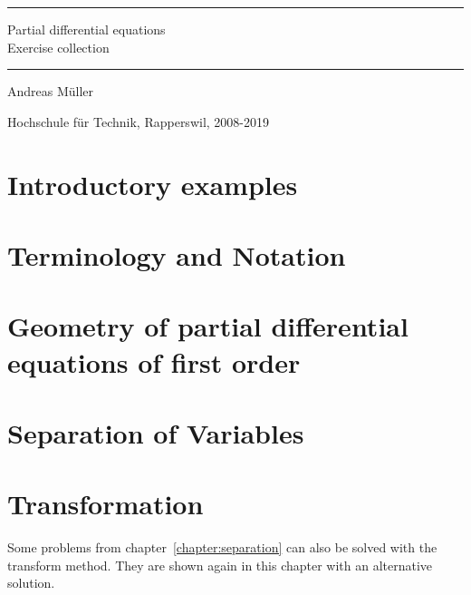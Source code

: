 \documentclass[a4paper,12pt]{book}
\begin{document}
\pagestyle{fancy}
\rhead{}
\frontmatter
\newcommand\HRule{\noindent\rule{\linewidth}{1.5pt}}
\begin{titlepage}
\HRule
\vspace*{2pt}
\begin{flushright}
{\Huge
Partial differential equations\\
\bigskip
Exercise collection}
\end{flushright}
\HRule
\begin{flushright}
\vspace{30pt}
\LARGE
Andreas Müller
\end{flushright}
\begin{center}
Hochschule für Technik, Rapperswil, 2008-2019
\end{center}
\end{titlepage}
\hypersetup{
	colorlinks=true,
	linktoc=all,
	linkcolor=blue
}
\tableofcontents
\newenvironment{beispiel}[1][Example]{%
\begin{proof}[#1]%
\renewcommand{\qedsymbol}{$\bigcirc$}
}{\end{proof}}
\mainmatter


\chapter{Introductory examples}

\chapter{Terminology and Notation}

\chapter{Geometry of partial differential equations of first order
\label{chapter:separation}}

\chapter{Separation of Variables\label{chapter:separation}}

\chapter{Transformation}
Some problems from chapter~\ref{chapter:separation}
can also be solved with the transform method.
They are shown again in this chapter with an alternative solution.
\bigskip
\end{document}
